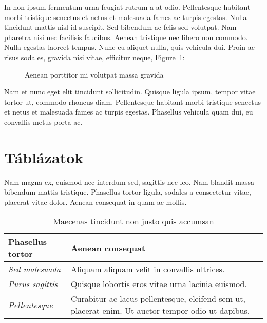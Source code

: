 In non ipsum fermentum urna feugiat rutrum a at odio. Pellentesque habitant morbi tristique senectus et netus et malesuada fames ac turpis egestas. Nulla tincidunt mattis nisl id suscipit. Sed bibendum ac felis sed volutpat. Nam pharetra nisi nec facilisis faucibus. Aenean tristique nec libero non commodo. Nulla egestas laoreet tempus. Nunc eu aliquet nulla, quis vehicula dui. Proin ac risus sodales, gravida nisi vitae, efficitur neque, Figure~\ref{fig:example-2}:

\begin{figure}[H]
	\centering
	\hspace{5pt}
	\caption{Aenean porttitor mi volutpat massa gravida}
	\label{fig:example-2}
\end{figure}

Nam et nunc eget elit tincidunt sollicitudin. Quisque ligula ipsum, tempor vitae tortor ut, commodo rhoncus diam. Pellentesque habitant morbi tristique senectus et netus et malesuada fames ac turpis egestas. Phasellus vehicula quam dui, eu convallis metus porta ac.


\section{Táblázatok}

Nam magna ex, euismod nec interdum sed, sagittis nec leo. Nam blandit massa bibendum mattis tristique. Phasellus tortor ligula, sodales a consectetur vitae, placerat vitae dolor. Aenean consequat in quam ac mollis. 

\begin{table}[H]
	\centering
	\begin{tabular}{ | m{} | m{} | }
		\hline
		\textbf{Phasellus tortor} & \textbf{Aenean consequat} \\
		\hline \hline
		\emph{Sed malesuada} & Aliquam aliquam velit in convallis ultrices. \\
		\hline
		\emph{Purus sagittis} &  Quisque lobortis eros vitae urna lacinia euismod. \\
		\hline
		\emph{Pellentesque} & Curabitur ac lacus pellentesque, eleifend sem ut, placerat enim. Ut auctor tempor odio ut dapibus. \\
		\hline
	\end{tabular}
	\caption{Maecenas tincidunt non justo quis accumsan}
	\label{tab:example-1}
\end{table}

